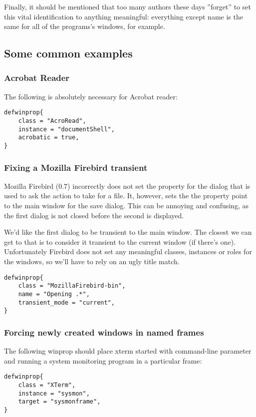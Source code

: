 Finally, it should be mentioned that too many authors these days
''forget'' to set this vital identification to anything meaningful:
everything except name is the same for all of the programs's 
windows, for example.

\subsection{Some common examples}

\subsubsection{Acrobat Reader}

The following is absolutely necessary for Acrobat reader:

\begin{verbatim}
defwinprop{
    class = "AcroRead",
    instance = "documentShell",
    acrobatic = true,
}
\end{verbatim}

\subsubsection{Fixing a Mozilla Firebird transient}

Mozilla Firebird (0.7) incorrectly does not set the  
property for the dialog that is used to ask the action to take for a file.
It, however, sets the the property point to the main window for the save
dialog. This can be annoying and confusing, as the first dialog is not 
closed before the second is displayed.

We'd like the first dialog to be transient to the main window. The closest
we can get to that is to consider it transient to the current window (if
there's one). Unfortunately Firebird does not set any meaningful classes, 
instances or roles for the windows, so we'll have to rely on an ugly title
match.

\begin{verbatim}
defwinprop{
    class = "MozillaFirebird-bin",
    name = "Opening .*",
    transient_mode = "current",
}
\end{verbatim}

\subsubsection{Forcing newly created windows in named frames}

The following winprop should place xterm started with command-line parameter
\mbox{} and running a system monitoring program in a
particular frame:
\begin{verbatim}
defwinprop{
    class = "XTerm",
    instance = "sysmon",
    target = "sysmonframe",
}
\end{verbatim}

